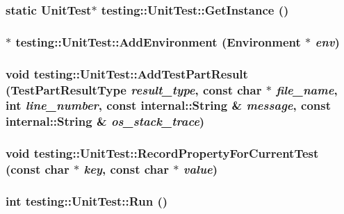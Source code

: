 \subsubsection{\setlength{\rightskip}{0pt plus 5cm}static {\bf UnitTest}$\ast$ testing::UnitTest::GetInstance ()\hspace{0.3cm}{\tt  [static]}}\label{classtesting_1_1UnitTest_db04e1d682a2d7cfc3aa2c5afe3cac5f}


\subsubsection{$\ast$ testing::UnitTest::AddEnvironment ({\bf Environment} $\ast$ {\em env})}\label{classtesting_1_1UnitTest_b1427eccd1c7b3fd6a033e22d52cbdee}


\subsubsection{\setlength{\rightskip}{0pt plus 5cm}void testing::UnitTest::AddTestPartResult ({\bf TestPartResultType} {\em result\_\-type}, const char $\ast$ {\em file\_\-name}, int {\em line\_\-number}, const {\bf internal::String} \& {\em message}, const {\bf internal::String} \& {\em os\_\-stack\_\-trace})}\label{classtesting_1_1UnitTest_fad5417ce02bc444a32f6e1659729a80}


\subsubsection{\setlength{\rightskip}{0pt plus 5cm}void testing::UnitTest::RecordPropertyForCurrentTest (const char $\ast$ {\em key}, const char $\ast$ {\em value})}\label{classtesting_1_1UnitTest_aa1fa510a34fb035d88bc5e615fbbd1e}


\subsubsection{\setlength{\rightskip}{0pt plus 5cm}int testing::UnitTest::Run ()}\label{classtesting_1_1UnitTest_5fd408b9dd00b8b3495ef66428fa6d1c}


